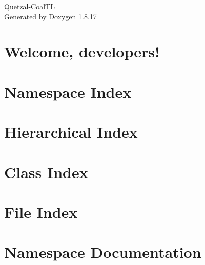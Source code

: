 \let\mypdfximage\pdfximage\def\pdfximage{\immediate\mypdfximage}\documentclass[twoside]{book}
\newcommand{\+}{\discretionary{\mbox{\scriptsize$\hookleftarrow$}}{}{}}
\newcommand{\clearemptydoublepage}{%
  \newpage{\pagestyle{empty}\cleardoublepage}%
}
\begin{document}
\hypersetup{pageanchor=false,
             bookmarksnumbered=true,
             pdfencoding=unicode
            }
\begin{titlepage}
\vspace*{7cm}
\begin{center}%
{\Large Quetzal-\/\+Coal\+TL }\\
\vspace*{1cm}
{\large Generated by Doxygen 1.8.17}\\
\end{center}
\end{titlepage}
\clearemptydoublepage
{}
\tableofcontents
\clearemptydoublepage
{}
\hypersetup{pageanchor=true}

\chapter{Welcome, developers!}
\label{index}\hypertarget{index}{}
\chapter{Namespace Index}

\chapter{Hierarchical Index}

\chapter{Class Index}

\chapter{File Index}

\chapter{Namespace Documentation}





















\end{document}
